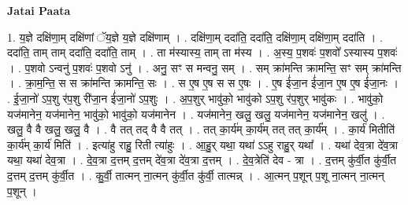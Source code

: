 \documentclass[17pt]{extarticle}
\begin{document}
\textbf{Jatai Paata} \newline

1. य॒ज्ञे दक्षि॑णा॒म् दक्षि॑णां ॅय॒ज्ञे य॒ज्ञे दक्षि॑णाम् । . दक्षि॑णा॒म् ददा॑ति॒ ददा॑ति॒ दक्षि॑णा॒म् दक्षि॑णा॒म् ददा॑ति । . ददा॑ति॒ ताम् ताम् ददा॑ति॒ ददा॑ति॒ ताम् । . ता म॑स्यास्य॒ ताम् ता म॑स्य । . अ॒स्य॒ प॒शवः॑ प॒शवो᳚ ऽस्यास्य प॒शवः॑ । . प॒शवो ऽन्वनु॑ प॒शवः॑ प॒शवो ऽनु॑ । . अनु॒ सꣳ स मन्वनु॒ सम् । . सम् क्रा॑मन्ति क्रामन्ति॒ सꣳ सम् क्रा॑मन्ति । . क्रा॒म॒न्ति॒ स स क्रा॑मन्ति क्रामन्ति॒ सः । . स ए॒ष ए॒ष स स ए॒षः । . ए॒ष ई॑जा॒न ई॑जा॒न ए॒ष ए॒ष ई॑जा॒नः । . ई॒जा॒नो॑ ऽप॒शु र॑प॒शु री॑जा॒न ई॑जा॒नो॑ ऽप॒शुः । . अ॒प॒शुर् भावु॑को॒ भावु॑को ऽप॒शु र॑प॒शुर् भावु॑कः । . भावु॑को॒ यज॑मानेन॒ यज॑मानेन॒ भावु॑को॒ भावु॑को॒ यज॑मानेन । . यज॑मानेन॒ खलु॒ खलु॒ यज॑मानेन॒ यज॑मानेन॒ खलु॑ । . खलु॒ वै वै खलु॒ खलु॒ वै । . वै तत् तद् वै वै तत् । . तत् का॒र्य॑म् का॒र्य॑म् तत् तत् का॒र्य᳚म् । . का॒र्य॑ मितीति॑ का॒र्य॑म् का॒र्य॑ मिति॑ । . इत्या॑हु राहु॒ रिती त्या॑हुः । . आ॒हु॒र् यथा॒ यथा॑ ऽऽहु राहु॒र् यथा᳚ । . यथा॑ देव॒त्रा दे॑व॒त्रा यथा॒ यथा॑ देव॒त्रा । . दे॒व॒त्रा द॒त्तम् द॒त्तम् दे॑व॒त्रा दे॑व॒त्रा द॒त्तम् । . दे॒व॒त्रेति॑ देव - त्रा । . द॒त्तम् कु॑र्वी॒त कु॑र्वी॒त द॒त्तम् द॒त्तम् कु॑र्वी॒त । . कु॒र्वी॒ तात्मन् ना॒त्मन् कु॑र्वी॒त कु॑र्वी॒ तात्मन्न् । . आ॒त्मन् प॒शून् प॒शू ना॒त्मन् ना॒त्मन् प॒शून् । \newline
\end{document}
